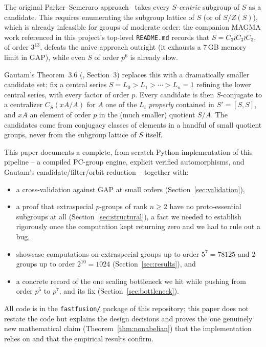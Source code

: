 \documentclass[11pt]{article}
\theoremstyle{remark}
\begin{document}
The original Parker--Semeraro approach~\cite{parkersemeraro} takes every
\emph{$S$-centric} subgroup of $S$ as a candidate. This requires enumerating
the subgroup lattice of $S$ (or of $S/Z(S)$), which is already infeasible for
groups of moderate order: the companion MAGMA work referenced in this
project's top-level \texttt{README.md} records that $S = C_3 \wr C_3 \wr
C_3$, of order $3^{13}$, defeats the naive approach outright (it exhausts a
7\,GB memory limit in GAP), while even $S$ of order $p^6$ is already slow.

Gautam's Theorem~3.6 (\cite{gautam2024}, Section~3) replaces this with a
dramatically smaller candidate set: fix a central series $S = L_0 > L_1 >
\cdots > L_n = 1$ refining the lower central series, with every factor of
order $p$. Every candidate is then $S$-conjugate to a centralizer
$C_S(xA/A)$ for $A$ one of the $L_i$ \emph{properly} contained in
$S' = [S,S]$, and $xA$ an element of order $p$ in the (much smaller) quotient
$S/A$. The candidates come from conjugacy classes of elements in a handful
of small quotient groups, never from the subgroup lattice of $S$ itself.

This paper documents a complete, from-scratch Python implementation of this
pipeline -- a compiled PC-group engine, explicit verified automorphisms, and
Gautam's candidate/filter/orbit reduction -- together with:
\begin{itemize}[nosep]
  \item a cross-validation against GAP at small orders (Section~\ref{sec:validation}),
  \item a proof that extraspecial $p$-groups of rank $n \ge 2$ have no
    proto-essential subgroups at all (Section~\ref{sec:structural}), a fact
    we needed to establish rigorously once the computation kept returning
    zero and we had to rule out a bug,
  \item showcase computations on extraspecial groups up to order $5^7 =
    78125$ and $2$-groups up to order $2^{10} = 1024$
    (Section~\ref{sec:results}), and
  \item a concrete record of the one scaling bottleneck we hit while pushing
    from order $p^5$ to $p^7$, and its fix (Section~\ref{sec:bottleneck}).
\end{itemize}

All code is in the \texttt{fastfusion/} package of this repository; this
paper does not restate the code but explains the design decisions and proves
the one genuinely new mathematical claim (Theorem~\ref{thm:nonabelian}) that
the implementation relies on and that the empirical results confirm.
\end{document}
